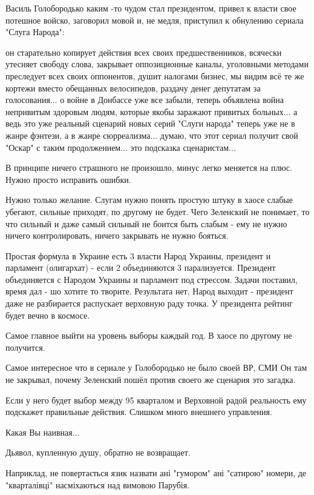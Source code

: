 \begin{itemize}
Василь Голобородько каким -то чудом стал президентом, привел к власти свое
потешное войско, заговорил мовой и, не медля, приступил к обнулению сериала
"Слуга Народа":

он старательно копирует действия всех своих предшественников, всячески утесняет
свободу слова, закрывает оппозиционные каналы, уголовными методами преследует
всех своих оппонентов, душит налогами бизнес, мы видим всё те же кортежи вместо
обещанных велосипедов, раздачу денег депутатам за голосования... о войне в
Донбассе уже все забыли, теперь объявлена война непривитым здоровым людям,
которые якобы заражают привитых больных... а ведь это уже реальный сценарий
новых серий "Слуги народа" теперь уже не в жанре фэнтези, а в жанре
сюрреализма... думаю, что этот сериал получит свой "Оскар" с таким
продолжением... это подсказка сценаристам...


В принципе ничего страшного не произошло, минус легко меняется на плюс. Нужно
просто исправить ошибки.

Нужно только желание. Слугам нужно понять простую штуку в хаосе слабые убегают,
сильные приходят, по другому не будет. Чего Зеленский не понимает, то что
сильный и даже самый сильный не боится быть слабым - ему не нужно ничего
контролировать, ничего закрывать не нужно бояться.

Простая формула в Украине есть 3 власти Народ Украины, президент и парламент
(олигархат) - если 2 объединяются 3 парализуется. Президент объединяется с
Народом Украины и парламент под стрессом. Задачи поставил, время дал - шо
хотите то творите. Результата нет, Народ выходит - президент даже не
разбирается распускает верховную раду точка. У президента рейтинг будет вечно в
космосе.

Самое главное выйти на уровень выборы каждый год. В хаосе по другому не
получится.

Самое интересное что в сериале у Голобородько не было своей ВР, СМИ Он там не
закрывал, почему Зеленский пошёл против своего же сценария это загадка.

Если у него будет выбор между 95 кварталом и Верховной радой реальность ему
подскажет правильные действия. Слишком много внешнего управления.

Какая Вы наивная...

Дьявол, купленную душу, обратно не возвращает.

Наприклад, не повертається язик назвати ані "гумором" ані "сатирою" номери, де "кварталівці" насміхаються над вимовою Парубія.


\end{itemize}
